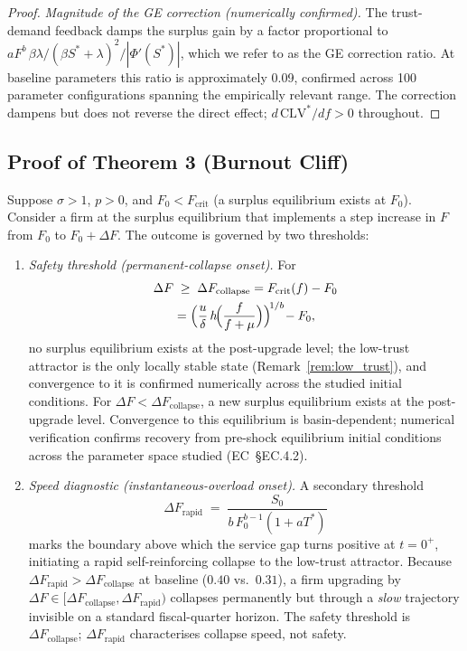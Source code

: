 \documentclass[msom,dblanonrev]{informs4}
\begin{document}
\begin{proof}
\textit{Magnitude of the GE correction (numerically confirmed).} The trust-demand feedback damps the surplus gain by a factor proportional to $aF^b\,\beta\lambda/(\beta S^*+\lambda)^2 / |\Phi'(S^*)|$, which we refer to as the GE correction ratio. At baseline parameters this ratio is approximately 0.09, confirmed across 100 parameter configurations spanning the empirically relevant range. The correction dampens but does not reverse the direct effect; $d\,\mathrm{CLV}^*/df > 0$ throughout.
\end{proof}


\subsection{Proof of Theorem 3 (Burnout Cliff)}\label{sec:ec:proof3}

\begin{theorem}
Suppose $\sigma > 1$, $p > 0$, and $F_0 < F_{\mathrm{crit}}$ (a surplus equilibrium exists at $F_0$). Consider a firm at the surplus equilibrium that implements a step increase in $F$ from $F_0$ to $F_0 + \Delta F$. The outcome is governed by two thresholds:
\begin{enumerate}
    \item[(i)] \emph{Safety threshold (permanent-collapse onset).} For
    \begin{align*}
       \Delta F &\;\geq\; \Delta F_{\mathrm{collapse}} = F_{\mathrm{crit}}(f) - F_0 \\
         &= \Bigl(\frac{u}{\delta}\,h\!\Bigl(\frac{f}{f+\mu}\Bigr)\Bigr)^{\!1/b} \!- F_0,
    \end{align*}
    no surplus equilibrium exists at the post-upgrade level; the low-trust attractor is the only locally stable state (Remark~\ref{rem:low_trust}), and convergence to it is confirmed numerically across the studied initial conditions. For $\Delta F < \Delta F_{\mathrm{collapse}}$, a new surplus equilibrium exists at the post-upgrade level. Convergence to this equilibrium is basin-dependent; numerical verification confirms recovery from pre-shock equilibrium initial conditions across the parameter space studied (EC~\S EC.4.2).
    \item[(ii)] \emph{Speed diagnostic (instantaneous-overload onset).} A secondary threshold
    \[
       \Delta F_{\mathrm{rapid}} \;=\; \frac{S_0}{b\,F_0^{b-1}(1+aT^*)}
    \]
    marks the boundary above which the service gap turns positive at $t = 0^+$, initiating a rapid self-reinforcing collapse to the low-trust attractor. Because $\Delta F_{\mathrm{rapid}} > \Delta F_{\mathrm{collapse}}$ at baseline ($0.40$ vs.\ $0.31$), a firm upgrading by $\Delta F \in [\Delta F_{\mathrm{collapse}}, \Delta F_{\mathrm{rapid}})$ collapses permanently but through a \emph{slow} trajectory invisible on a standard fiscal-quarter horizon. The safety threshold is $\Delta F_{\mathrm{collapse}}$; $\Delta F_{\mathrm{rapid}}$ characterises collapse speed, not safety.
\end{enumerate}
\end{theorem}
\end{document}
